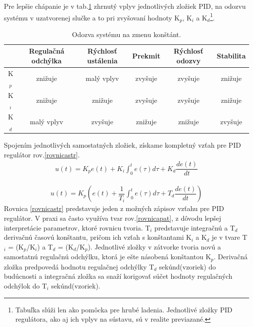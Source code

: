 Pre lepšie chápanie je v tab.\ref{PIDvplyv}\cite{pidcontrol} zhrnutý vplyv jednotlivých zložiek PID, na odozvu systému v uzatvorenej slučke a to pri zvyšovaní hodnoty K$_p$, K$_i$ a K$_d$\footnote[10]{Tabuľka slúži len ako pomôcka pre hrubé ladenia. Jednotlivé zložky PID regulátora, ako aj ich vplyv na sústavu, sú v realite previazané.}. 

\begin{table}[!tbh]
	\begin{tabular}{|c|c|c|c|c|c|}
		\hline
		& Regulačná odchýlka & Rýchlosť ustálenia & Prekmit & Rýchlosť odozvy & Stabilita \\ \hline
		K$_p$                    & znižuje            & malý vplyv         & zvyšuje      & zvyšuje         & znižuje           \\ \hline
		K$_i$                    & znižuje            & znižuje            & zvyšuje      & zvyšuje         & znižuje           \\ \hline
		K$_d$                    & malý vplyv         & zvyšuje            & znižuje      & znižuje         & zvyšuje           \\ \hline
	\end{tabular}
	\caption{Odozva systému na zmenu konštánt.}
	\label{PIDvplyv}
\end{table}

Spojením jednotlivých samostatných zložiek, získame kompletný vzťah pre PID regulátor rov.\ref{rovnicastr}.
\begin{align}
	\label{rovnicastr}
	u(t)=K_p e(t) + K_i  \int_{0}^{t} e(\tau)d\tau + K_d  \dfrac{de(t)}{dt}
\end{align}

\begin{align}
	\label{rovnicapat}
	u(t)=K_p \left(e(t) + \dfrac{1}{T_i}  \int_{0}^{t} e(\tau)d\tau + T_d  \dfrac{de(t)}{dt}\right)
\end{align}
Rovnica \ref{rovnicastr} predstavuje jeden z možných zápisov vzťahu pre PID regulátor. V praxi sa často využíva tvar rov.\ref{rovnicapat}, z dôvodu lepšej interpretácie parametrov, ktoré rovnicu tvoria. T$_i$ predstavuje integračnú a T$_d$ derivačnú časovú konštantu, pričom ich vzťah s konštantami K$_i$ a K$_d$ je v tvare T$_i$ = (K$_p$/K$_i$) a T$_d$ = (K$_d$/K$_p$). Jednotlivé zložky v zátvorke tvoria novú a samostatnú regulačnú odchýlku, ktorá je ešte násobená konštantou K$_p$. Derivačná zložka predpovedá hodnotu regulačnej odchýlky T$_d$ sekúnd(vzoriek) do budúcnosti a integračná zložka sa snaží korigovať súčet hodnoty regulačných odchýlok do T$_i$ sekúnd(vzoriek)\cite{pidcontrol}.

